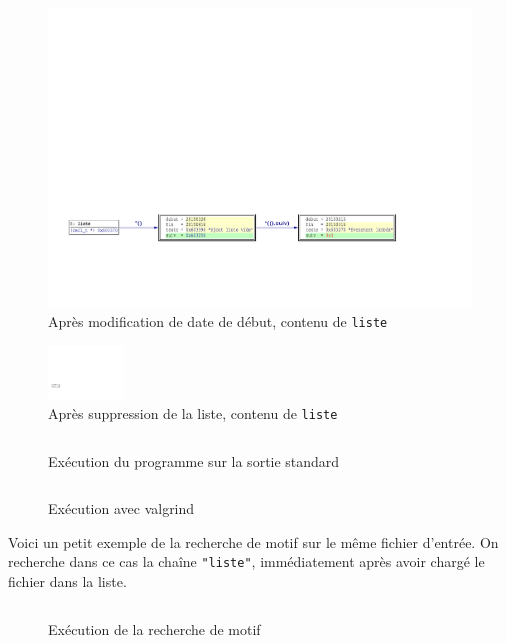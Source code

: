 \begin{figure}[h!]
	\centering
	\includegraphics[width=15cm,clip=true,trim=1cm 4cm 5cm 14cm]{../tests/ddd_graph/modification}
	\caption{Après modification de date de début, contenu de \texttt{liste}}
\end{figure}

\begin{figure}[h!]
	\centering
	\includegraphics[width=2cm,clip=true,trim=1cm 4.5cm 25cm 15cm]{../tests/ddd_graph/suppression}
	\caption{Après suppression de la liste, contenu de \texttt{liste}}
\end{figure}

\begin{figure}[h!]
	\centering
	\inputminted[frame=single,label=Terminal]{text}{../tests/resultat_test_insert}
	\caption{Exécution du programme sur la sortie standard}
\end{figure}

\newpage

\begin{figure}[h!]
	\centering
	\inputminted[frame=single,label=Terminal]{text}{../tests/valgrind_report}
	\caption{Exécution avec valgrind}
\end{figure}

Voici un petit exemple de la recherche de motif sur le même fichier d'entrée. On recherche dans ce cas la chaîne \texttt{"liste"}, immédiatement après avoir chargé le fichier dans la liste.

\begin{figure}[h!]
	\centering
	\inputminted[frame=single,label=Terminal]{text}{../tests/resultat_test_motif}
	\caption{Exécution de la recherche de motif}
\end{figure}